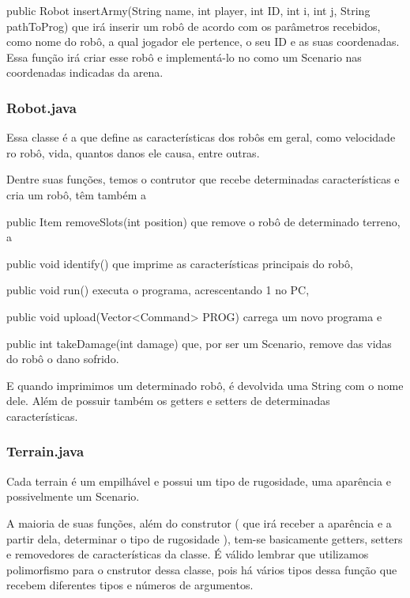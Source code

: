 \documentclass[a4paper]{article}
\begin{document}
{{{{{{{{{{{{{{{		    {\textcolor{NavyBlue}{public Robot insertArmy(String
		    name, int player, int ID, int i, int j, String pathToProg)}
            que irá inserir um robô de acordo com os parâmetros
            recebidos, como nome do robô, a qual jogador ele pertence,
            o seu ID e as suas coordenadas.
            Essa função irá criar esse robô e implementá-lo no como 
            um Scenario nas coordenadas indicadas da arena.
		    
		\subsubsection{ Robot.java }
			Essa classe é a que define as características dos robôs
			em geral, como velocidade ro robô, vida, quantos danos ele
			causa, entre outras.
			
			Dentre suas funções, temos o contrutor que recebe determinadas
			características e cria um robô, têm também a
			 
			{\textcolor{NavyBlue}{public Item removeSlots(int position)}
			que remove o robô de determinado terreno, a
			
			{\textcolor{NavyBlue}{public void identify()}
			que imprime as características principais do robô,
			
			{\textcolor{NavyBlue}{public void run()}
			executa o programa, acrescentando 1 no PC,
			
			{\textcolor{NavyBlue}{public void upload(Vector<Command> PROG)}
			carrega um novo programa e 
			
			{\textcolor{NavyBlue}{public int takeDamage(int damage)}
			que, por ser um Scenario, remove das vidas do robô o dano 
			sofrido.
			
			E quando imprimimos um determinado robô, é devolvida uma
			String com o nome dele. Além de possuir também os getters
			e setters de determinadas características.
		
		\subsubsection{ Terrain.java }
		    Cada terrain é um empilhável e possui um tipo de 
		    rugosidade, uma aparência e possivelmente um
		    Scenario.
		    
		    A maioria de suas funções, além do construtor ( que
		    irá receber a aparência e a partir dela, determinar 
		    o tipo de rugosidade ), tem-se basicamente getters,
		    setters e removedores de características da classe.
		    É válido lembrar que utilizamos polimorfismo para o
		    cnstrutor dessa classe, pois há vários tipos dessa
		    função que recebem diferentes tipos e números de
		    argumentos.
		    
}}}}}}}}}}}}}}}}}}}}}
\end{document}
